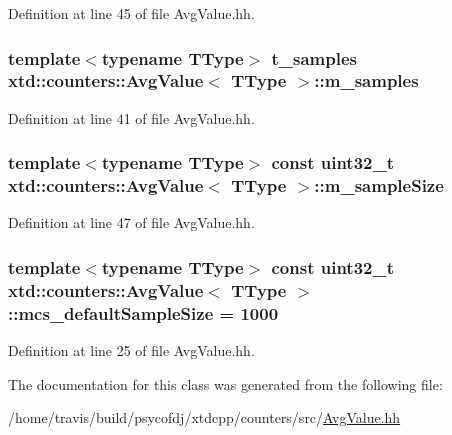 Definition at line 45 of file Avg\-Value.\-hh.

\hypertarget{classxtd_1_1counters_1_1AvgValue_a787afb6a601eb29f48a0fd247524cf84}{
\subsubsection[{m\-\_\-samples}]{\setlength{\rightskip}{0pt plus 5cm}template$<$typename T\-Type$>$ {\bf t\-\_\-samples} {\bf xtd\-::counters\-::\-Avg\-Value}$<$ T\-Type $>$\-::m\-\_\-samples\hspace{0.3cm}{\ttfamily [protected]}}}\label{classxtd_1_1counters_1_1AvgValue_a787afb6a601eb29f48a0fd247524cf84}


Definition at line 41 of file Avg\-Value.\-hh.

\hypertarget{classxtd_1_1counters_1_1AvgValue_a85edafd4829b5aa5be6562cadd8e4764}{
\subsubsection[{m\-\_\-sample\-Size}]{\setlength{\rightskip}{0pt plus 5cm}template$<$typename T\-Type$>$ const uint32\-\_\-t {\bf xtd\-::counters\-::\-Avg\-Value}$<$ T\-Type $>$\-::m\-\_\-sample\-Size\hspace{0.3cm}{\ttfamily [protected]}}}\label{classxtd_1_1counters_1_1AvgValue_a85edafd4829b5aa5be6562cadd8e4764}


Definition at line 47 of file Avg\-Value.\-hh.

\hypertarget{classxtd_1_1counters_1_1AvgValue_aa65f0400547f2cb940ec9b79cbc3a662}{
\subsubsection[{mcs\-\_\-default\-Sample\-Size}]{\setlength{\rightskip}{0pt plus 5cm}template$<$typename T\-Type$>$ const uint32\-\_\-t {\bf xtd\-::counters\-::\-Avg\-Value}$<$ T\-Type $>$\-::mcs\-\_\-default\-Sample\-Size = 1000\hspace{0.3cm}{\ttfamily [static]}}}\label{classxtd_1_1counters_1_1AvgValue_aa65f0400547f2cb940ec9b79cbc3a662}


Definition at line 25 of file Avg\-Value.\-hh.



The documentation for this class was generated from the following file\-:\begin{DoxyCompactItemize}
\item 
/home/travis/build/psycofdj/xtdcpp/counters/src/\hyperlink{AvgValue_8hh}{Avg\-Value.\-hh}\end{DoxyCompactItemize}
